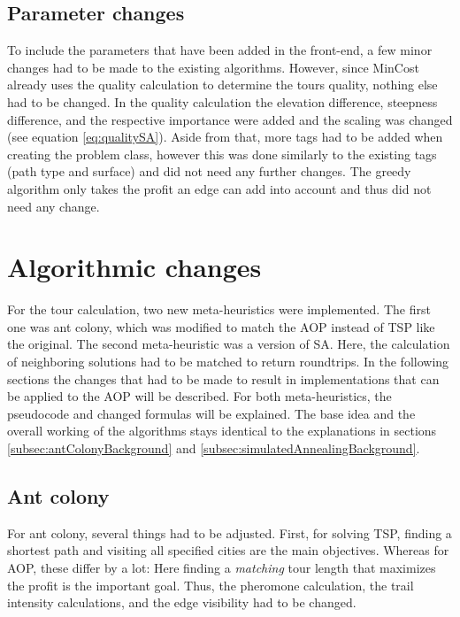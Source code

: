 \subsection{Parameter changes}
\label{subsec:parameterChanges}

To include the parameters that have been added in the front-end, a few minor changes had to be made to the existing algorithms. 
However, since MinCost already uses the quality calculation to determine the tours quality, nothing else had to be changed.
In the quality calculation the elevation difference, steepness difference, and the respective importance were added and the scaling was changed (see equation \ref{eq:qualitySA}).
Aside from that, more tags had to be added when creating the problem class, however this was done similarly to the existing tags (path type and surface) and did not need any further changes.
The greedy algorithm only takes the profit an edge can add into account and thus did not need any change.


\section{Algorithmic changes}
\label{sec:algorithmicChanges}

For the tour calculation, two new meta-heuristics were implemented.
The first one was ant colony, which was modified to match the AOP instead of TSP like the original.
The second meta-heuristic was a version of SA.
Here, the calculation of neighboring solutions had to be matched to return roundtrips.
In the following sections the changes that had to be made to result in implementations that can be applied to the AOP will be described.
For both meta-heuristics, the pseudocode and changed formulas will be explained.
The base idea and the overall working of the algorithms stays identical to the explanations in sections \ref{subsec:antColonyBackground} and \ref{subsec:simulatedAnnealingBackground}.


\subsection{Ant colony}
\label{subsec:antColonyImplementation}

For ant colony, several things had to be adjusted. 
First, for solving TSP, finding a shortest path and visiting all specified cities are the main objectives.
Whereas for AOP, these differ by a lot:
Here finding a \textit{matching} tour length that maximizes the profit is the important goal. 
Thus, the pheromone calculation, the trail intensity calculations, and the edge visibility had to be changed.

